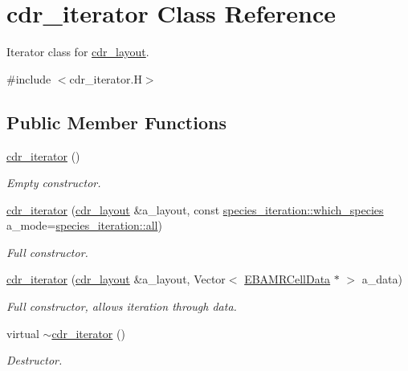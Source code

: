 \hypertarget{classcdr__iterator}{}\section{cdr\+\_\+iterator Class Reference}
\label{classcdr__iterator}


Iterator class for \hyperlink{classcdr__layout}{cdr\+\_\+layout}.  




{\ttfamily \#include $<$cdr\+\_\+iterator.\+H$>$}

\subsection*{Public Member Functions}
\begin{DoxyCompactItemize}
\item 
\hyperlink{classcdr__iterator_a953702aba7b2cf5967e7009f1e814960}{cdr\+\_\+iterator} ()
\begin{DoxyCompactList}\small\item\em Empty constructor. \end{DoxyCompactList}\item 
\hyperlink{classcdr__iterator_a957fbddb66ebf8019e075ce21bdc2974}{cdr\+\_\+iterator} (\hyperlink{classcdr__layout}{cdr\+\_\+layout} \&a\+\_\+layout, const \hyperlink{namespacespecies__iteration_a3384cfe7d9c1a8fa3dbc0c75efc8fb7e}{species\+\_\+iteration\+::which\+\_\+species} a\+\_\+mode=\hyperlink{namespacespecies__iteration_a3384cfe7d9c1a8fa3dbc0c75efc8fb7ea26e8600c438a9172a790f5b93e5b359f}{species\+\_\+iteration\+::all})
\begin{DoxyCompactList}\small\item\em Full constructor. \end{DoxyCompactList}\item 
\hyperlink{classcdr__iterator_afd192a3e19066f042c8a9f7808dc62fa}{cdr\+\_\+iterator} (\hyperlink{classcdr__layout}{cdr\+\_\+layout} \&a\+\_\+layout, Vector$<$ \hyperlink{type__definitions_8H_a7e610f301989e5e07781c5e338bdb7c3}{E\+B\+A\+M\+R\+Cell\+Data} $\ast$ $>$ a\+\_\+data)
\begin{DoxyCompactList}\small\item\em Full constructor, allows iteration through data. \end{DoxyCompactList}\item 
virtual \hyperlink{classcdr__iterator_acc42f4be3ba2606a111bec75c14bf993}{$\sim$cdr\+\_\+iterator} ()
\begin{DoxyCompactList}\small\item\em Destructor. \end{DoxyCompactList}\item 

\end{DoxyCompactItemize}
